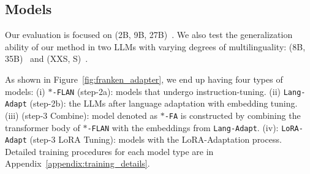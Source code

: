 
\subsection{Models}
Our evaluation is focused on \gemmatwo (2B, 9B, 27B)~\citep{team2024gemma}. We also test the generalization ability of our method in two LLMs with varying degrees of multilinguality: \aya (8B, 35B)~\citep{aryabumi2024aya} and \palmtwo (XXS, S)~\citep{anil2023palm}.

As shown in Figure~\ref{fig:franken_adapter}, we end up having four types of models: (i) \texttt{$*$-FLAN} (step-2a): models that undergo instruction-tuning. (ii) \texttt{Lang-Adapt} (step-2b): the LLMs after language adaptation with embedding tuning. (iii) \ouradapter (step-3 Combine): model denoted as \texttt{$*$-FA} is constructed by combining the transformer body of \texttt{$*$-FLAN} with the embeddings from \texttt{Lang-Adapt}. (iv): \texttt{LoRA-Adapt} (step-3 LoRA Tuning): \ouradapter models with the LoRA-Adaptation process. Detailed training procedures for each model type are in Appendix~\ref{appendix:training_details}.

  

